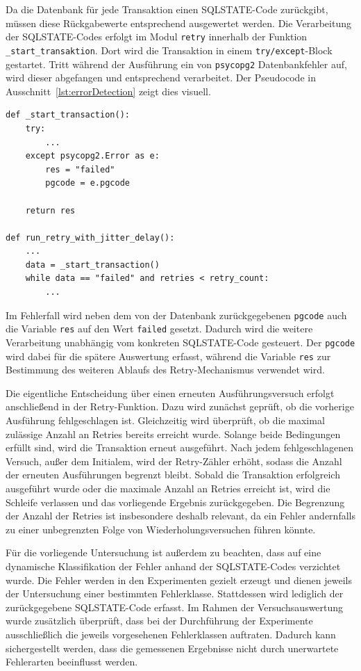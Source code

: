 
Da die Datenbank für jede Transaktion einen SQLSTATE-Code zurückgibt, müssen diese Rückgabewerte entsprechend
ausgewertet werden.
Die Verarbeitung der SQLSTATE-Codes erfolgt im Modul \texttt{retry} innerhalb der Funktion
\texttt{\_start\_transaktion}.
Dort wird die Transaktion in einem \texttt{try/except}-Block gestartet.
Tritt während der Ausführung ein von \texttt{psycopg2} Datenbankfehler auf, wird dieser abgefangen und
entsprechend verarbeitet.
Der Pseudocode in Ausschnitt~\ref{lst:errorDetection} zeigt dies visuell.

\begin{lstlisting}[style=pythoncode, caption={Fehlererkennung}, label={lst:errorDetection}]
def _start_transaction():
    try:
        ...
    except psycopg2.Error as e:
        res = "failed"
        pgcode = e.pgcode

    return res

def run_retry_with_jitter_delay():
    ...
    data = _start_transaction()
    while data == "failed" and retries < retry_count:
        ...
\end{lstlisting}

Im Fehlerfall wird neben dem von der Datenbank zurückgegebenen \texttt{pgcode} auch die Variable \texttt{res} auf
den Wert \texttt{failed} gesetzt.
Dadurch wird die weitere Verarbeitung unabhängig vom konkreten SQLSTATE-Code gesteuert.
Der \texttt{pgcode} wird dabei für die spätere Auswertung erfasst, während die Variable \texttt{res} zur Bestimmung des
weiteren Ablaufs des Retry-Mechanismus verwendet wird.

Die eigentliche Entscheidung über einen erneuten Ausführungsversuch erfolgt anschließend in der Retry-Funktion.
Dazu wird zunächst geprüft, ob die vorherige Ausführung fehlgeschlagen ist.
Gleichzeitig wird überprüft, ob die maximal zulässige Anzahl an Retries bereits erreicht wurde.
Solange beide Bedingungen erfüllt sind, wird die Transaktion erneut ausgeführt.
Nach jedem fehlgeschlagenen Versuch, außer dem Initialem, wird der Retry-Zähler erhöht, sodass die Anzahl der
erneuten Ausführungen begrenzt bleibt.
Sobald die Transaktion erfolgreich ausgeführt wurde oder die maximale Anzahl an Retries erreicht ist, wird die
Schleife verlassen und das vorliegende Ergebnis zurückgegeben.
Die Begrenzung der Anzahl der Retries ist insbesondere deshalb relevant, da ein Fehler andernfalls zu einer
unbegrenzten Folge von Wiederholungsversuchen führen könnte.

Für die vorliegende Untersuchung ist außerdem zu beachten, dass auf eine dynamische Klassifikation der Fehler
anhand der SQLSTATE-Codes verzichtet wurde.
Die Fehler werden in den Experimenten gezielt erzeugt und dienen jeweils der Untersuchung einer bestimmten
Fehlerklasse.
Stattdessen wird lediglich der zurückgegebene SQLSTATE-Code erfasst.
Im Rahmen der Versuchsauswertung wurde zusätzlich überprüft, dass bei der Durchführung der Experimente
ausschließlich die jeweils vorgesehenen Fehlerklassen auftraten.
Dadurch kann sichergestellt werden, dass die gemessenen Ergebnisse nicht durch unerwartete Fehlerarten beeinflusst
werden.